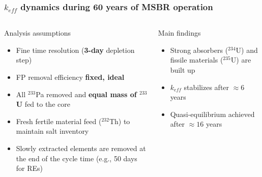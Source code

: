 \begin{frame}
\frametitle{$k_{eff}$ dynamics during 60 years of MSBR operation}
\vspace{-3mm}
\begin{columns}
	\column{4.3cm}
	\begin{block}{Analysis assumptions}
		\fontsize{7}{9}\selectfont
		\begin{itemize}
			\item Fine time resolution (\textbf{3-day} depletion step)
			\item FP removal efficiency \textbf{fixed, ideal}
			\item All $^{233}$Pa removed and \textbf{equal mass of $^{233}$U} 
			fed to the core
			\item Fresh fertile material feed ($^{232}$Th) to maintain salt 
			inventory
			\item Slowly extracted elements are removed at the end of the 
			cycle time (e.g., 50 days for REs)
		\end{itemize}
	\end{block}
	\vspace{-2mm}
	\begin{block}{Main findings}
	\fontsize{7}{9}\selectfont
	\begin{itemize}
		\item Strong absorbers ($^{234}$U) and fissile materials ($^{235}$U) 
		are built up
		\item $k_{eff}$ stabilizes after $\approx6$ years
		\item Quasi-equilibrium achieved after 
		$\approx16$ years
	\end{itemize}  
	\end{block}  	
	

\end{columns}
\end{frame}
